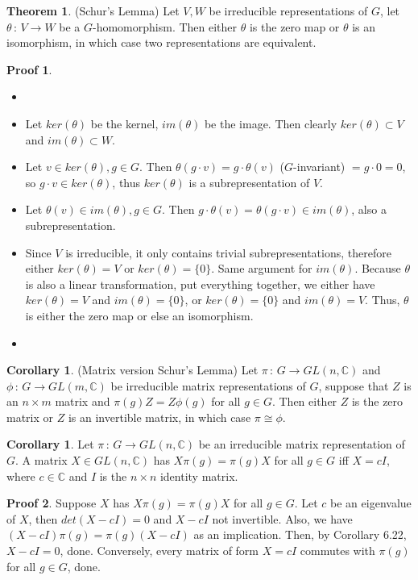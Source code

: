 \documentclass{book}
\newcommand{\C}{\mathbb{C}}
\theoremstyle{definition}
\newtheorem{theorem}[lemma]{Theorem}
\newtheorem{corollary}[lemma]{Corollary}
\theoremstyle{remarkstyle}
\newtheorem*{myproof}{Proof}%
\begin{document}
\begin{theorem}
    (Schur's Lemma) \newline
    Let $V,W$ be irreducible representations of $G$, let $\theta\,:\,V\rightarrow W$ be a $G$-homomorphism. Then either $\theta$ is the zero map or $\theta$ is an isomorphism, in which case two representations are equivalent.
\end{theorem}
\begin{myproof}
    \begin{itemize}
        \item[]
        \item Let $ker(\theta)$ be the kernel, $im(\theta)$ be the image. Then clearly $ker(\theta)\subset V$ and $im(\theta)\subset W$.
        \item Let $v\in ker(\theta), g\in G$. Then $\theta(g\cdot v)=g\cdot\theta(v)$ ($G$-invariant) $=g\cdot0=0$, so $g\cdot v\in ker(\theta)$, thus $ker(\theta)$ is a subrepresentation of $V$. 
        \item Let $\theta(v) \in im(\theta), g\in G$. Then $g\cdot\theta(v)=\theta(g\cdot v) \in im(\theta)$, also a subrepresentation. 
        \item Since $V$ is irreducible, it only contains trivial subrepresentations, therefore either $ker(\theta)=V$ or $ker(\theta)=\{0\}$. Same argument for $im(\theta)$. Because $\theta$ is also a linear transformation, put everything together, we either have $ker(\theta)=V$ and $im(\theta)=\{0\}$, or $ker(\theta)=\{0\}$ and $im(\theta)=V$. Thus, $\theta$ is either the zero map or else an isomorphism.
        \item[] 
    \end{itemize}
\end{myproof}

\begin{corollary}
    (Matrix version Schur's Lemma) \newline
    Let $\pi\,:\,G\rightarrow GL(n,\C)$ and $\phi\,:\,G\rightarrow GL(m,\C)$ be irreducible matrix representations of $G$, suppose that $Z$ is an $n\times m$ matrix and $\pi(g)Z=Z\phi(g)$ for all $g\in G$. Then either $Z$ is the zero matrix or $Z$ is an invertible matrix, in which case $\pi\cong\phi$. \newline
\end{corollary}

\begin{corollary}
     Let $\pi\,:\,G\rightarrow GL(n,\C)$ be an irreducible matrix representation of $G$. A matrix $X\in GL(n,\C)$ has $X\pi(g)=\pi(g)X$ for all $g\in G$ iff $X=cI$, where $c\in \C$ and $I$ is the $n\times n$ identity matrix. 
\end{corollary}
\begin{myproof}
    Suppose $X$ has $X\pi(g)=\pi(g)X$ for all $g\in G$. Let $c$ be an eigenvalue of $X$, then $det(X-cI)=0$ and $X-cI$ not invertible. Also, we have $(X-cI)\pi(g)=\pi(g)(X-cI)$ as an implication. Then, by Corollary 6.22, $X-cI=0$, done. Conversely, every matrix of form $X=cI$ commutes with $\pi(g)$ for all $g\in G$, done. \newline
\end{myproof}
\end{document}
